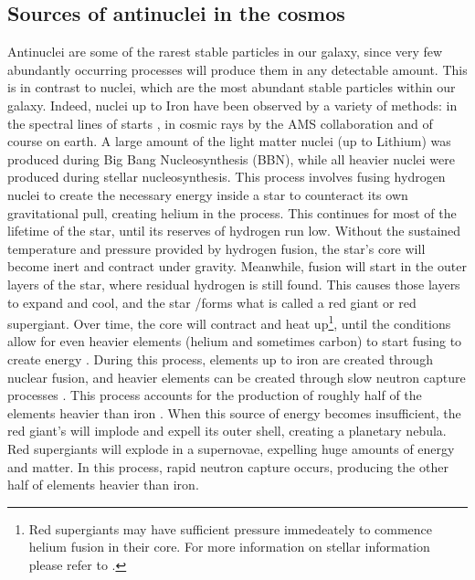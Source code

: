 \subsection{Sources of antinuclei in the cosmos}
Antinuclei are some of the rarest stable particles in our galaxy, since very few abundantly occurring processes will produce them in any detectable amount\cite{}. This is in contrast to nuclei, which are the most abundant stable particles within our galaxy. Indeed, nuclei up to Iron have been observed by a variety of methods: in the spectral lines of starts \cite{}, in cosmic rays by the AMS collaboration \cite{} and of course on earth. A large amount of the light matter nuclei (up to Lithium) was produced during Big Bang Nucleosynthesis (BBN)\cite{}, while all heavier nuclei were produced during stellar nucleosynthesis\cite{}. This process involves fusing hydrogen nuclei to create the necessary energy inside a star to counteract its own gravitational pull, creating helium in the process. This continues for most of the lifetime of the star, until its reserves of hydrogen run low. Without the sustained temperature and pressure provided by hydrogen fusion, the star's core will become inert and contract under gravity. Meanwhile, fusion will start in the outer layers of the star, where residual hydrogen is still found. This causes those layers to expand and cool, and the star /forms what is called a red giant\cite{} or red supergiant\cite{}. Over time, the core will contract and heat up\footnote{Red supergiants may have sufficient pressure immedeately to commence helium fusion in their core. For more information on stellar information please refer to \cite{}.}, until the conditions allow for even heavier elements (helium and sometimes carbon) to start fusing to create energy \cite{}. During this process, elements up to iron are created through nuclear fusion, and heavier elements can be created through slow neutron capture processes \cite{}. This process accounts for the production of roughly half of the elements heavier than iron \cite{}. When this source of energy becomes insufficient, the red giant's will implode and expell its outer shell, creating a planetary nebula. Red supergiants will explode in a supernovae\cite{}, expelling huge amounts of energy and matter. In this process, rapid neutron capture occurs, producing the other half of elements heavier than iron\cite{}. \\
